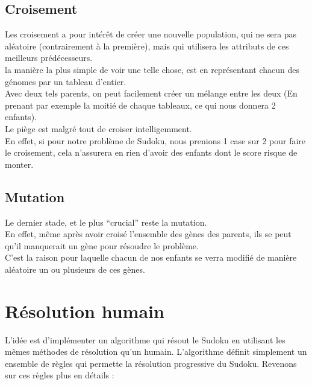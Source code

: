         \subsection{Croisement}
            Les croisement a pour intérêt de créer une nouvelle population, qui ne sera pas aléatoire (contrairement à la première), mais qui utilisera les attributs de ces meilleurs prédécesseurs.\\
            la manière la plus simple de voir une telle chose, est en représentant chacun des génomes par un tableau d'entier.\\
            Avec deux tels parents, on peut facilement créer un mélange entre les deux (En prenant par exemple la moitié de chaque tableaux, ce qui nous donnera 2 enfants).\\
            Le piège est malgré tout de croiser intelligemment.\\
            En effet, si pour notre problème de Sudoku, nous prenions 1 case sur 2 pour faire le croisement, cela n'assurera en rien d'avoir des enfants dont le score risque de monter.
        \subsection{Mutation}
            Le dernier stade, et le plus ``crucial'' reste la mutation.\\
            En effet, même après avoir croisé l'ensemble des gènes des parents, ils se peut qu'il manquerait un gène pour résoudre le problème.\\
            C'est la raison pour laquelle chacun de nos enfants se verra modifié de manière aléatoire un ou plusieurs de ces gènes.
    \section{Résolution humain}



        L'idée est d'implémenter un algorithme qui résout le Sudoku en utilisant les mêmes méthodes de résolution qu'un humain. L'algorithme définit simplement un ensemble de règles qui permette la résolution progressive du Sudoku. Revenons sur ces règles plus en détails :

